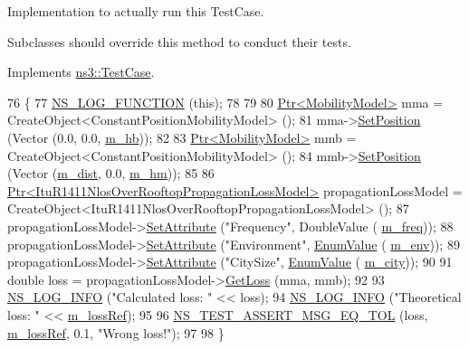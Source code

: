 Implementation to actually run this Test\+Case. 

Subclasses should override this method to conduct their tests. 

Implements \hyperlink{classns3_1_1TestCase_a8ff74680cf017ed42011e4be51917a24}{ns3\+::\+Test\+Case}.


\begin{DoxyCode}
76 \{
77   \hyperlink{log-macros-disabled_8h_a90b90d5bad1f39cb1b64923ea94c0761}{NS\_LOG\_FUNCTION} (\textcolor{keyword}{this});
78 
79 
80   \hyperlink{classns3_1_1Ptr}{Ptr<MobilityModel>} mma = CreateObject<ConstantPositionMobilityModel> ();
81   mma->\hyperlink{classns3_1_1MobilityModel_ac584b3d5a309709d2f13ed6ada1e7640}{SetPosition} (Vector (0.0, 0.0, \hyperlink{classItuR1411NlosOverRooftopPropagationLossModelTestCase_a20aacca0703f2c2c178fad2cc74e7ba6}{m\_hb}));
82 
83   \hyperlink{classns3_1_1Ptr}{Ptr<MobilityModel>} mmb = CreateObject<ConstantPositionMobilityModel> ();
84   mmb->\hyperlink{classns3_1_1MobilityModel_ac584b3d5a309709d2f13ed6ada1e7640}{SetPosition} (Vector (\hyperlink{classItuR1411NlosOverRooftopPropagationLossModelTestCase_a4556fa0562abd9944fe16e34175acaee}{m\_dist}, 0.0, \hyperlink{classItuR1411NlosOverRooftopPropagationLossModelTestCase_ac5f633470ec30d5f552bfd6ee8a9f9e8}{m\_hm}));
85 
86   \hyperlink{classns3_1_1Ptr}{Ptr<ItuR1411NlosOverRooftopPropagationLossModel>} 
      propagationLossModel = CreateObject<ItuR1411NlosOverRooftopPropagationLossModel> ();
87   propagationLossModel->\hyperlink{classns3_1_1ObjectBase_ac60245d3ea4123bbc9b1d391f1f6592f}{SetAttribute} (\textcolor{stringliteral}{"Frequency"}, DoubleValue (
      \hyperlink{classItuR1411NlosOverRooftopPropagationLossModelTestCase_a3d08d4b96f3bb1452d93c748e38c1321}{m\_freq}));
88   propagationLossModel->\hyperlink{classns3_1_1ObjectBase_ac60245d3ea4123bbc9b1d391f1f6592f}{SetAttribute} (\textcolor{stringliteral}{"Environment"}, \hyperlink{classns3_1_1EnumValue}{EnumValue} (
      \hyperlink{classItuR1411NlosOverRooftopPropagationLossModelTestCase_ae5ca78797b338b4b8805e7557d9f38eb}{m\_env}));
89   propagationLossModel->\hyperlink{classns3_1_1ObjectBase_ac60245d3ea4123bbc9b1d391f1f6592f}{SetAttribute} (\textcolor{stringliteral}{"CitySize"}, \hyperlink{classns3_1_1EnumValue}{EnumValue} (
      \hyperlink{classItuR1411NlosOverRooftopPropagationLossModelTestCase_a782e80cfb5e0a52f6bb033b5bc82ba37}{m\_city}));
90 
91   \textcolor{keywordtype}{double} loss = propagationLossModel->\hyperlink{classns3_1_1ItuR1411NlosOverRooftopPropagationLossModel_a73ddf8a5aec66d107cf56b33160dd116}{GetLoss} (mma, mmb);
92 
93   \hyperlink{group__logging_gafbd73ee2cf9f26b319f49086d8e860fb}{NS\_LOG\_INFO} (\textcolor{stringliteral}{"Calculated loss: "} << loss);
94   \hyperlink{group__logging_gafbd73ee2cf9f26b319f49086d8e860fb}{NS\_LOG\_INFO} (\textcolor{stringliteral}{"Theoretical loss: "} << \hyperlink{classItuR1411NlosOverRooftopPropagationLossModelTestCase_a559ade0fb976f4446df2182724ce8d94}{m\_lossRef});
95  
96   \hyperlink{group__testing_ga9e7861b56b4e70db3b56044cb7a28e41}{NS\_TEST\_ASSERT\_MSG\_EQ\_TOL} (loss, \hyperlink{classItuR1411NlosOverRooftopPropagationLossModelTestCase_a559ade0fb976f4446df2182724ce8d94}{m\_lossRef}, 0.1, \textcolor{stringliteral}{"Wrong loss!"});
97 
98 \}
\end{DoxyCode}


